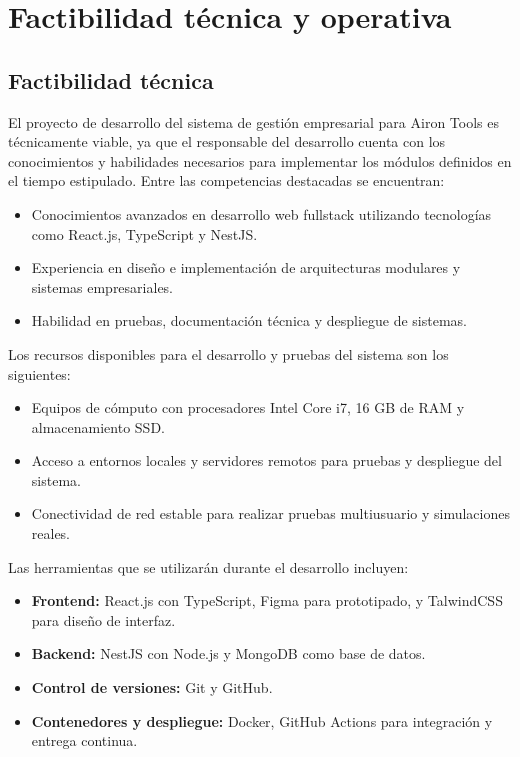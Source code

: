 



\section{Factibilidad técnica y operativa}

\subsection{Factibilidad técnica}

El proyecto de desarrollo del sistema de gestión empresarial para Airon Tools es técnicamente viable, ya que el responsable del desarrollo cuenta con los conocimientos y habilidades necesarios para implementar los módulos definidos en el tiempo estipulado. Entre las competencias destacadas se encuentran:

\begin{itemize}
	\item Conocimientos avanzados en desarrollo web fullstack utilizando tecnologías como React.js, TypeScript y NestJS.
	\item Experiencia en diseño e implementación de arquitecturas modulares y sistemas empresariales.
	\item Habilidad en pruebas, documentación técnica y despliegue de sistemas.
\end{itemize}

Los recursos disponibles para el desarrollo y pruebas del sistema son los siguientes:

\begin{itemize}
	\item Equipos de cómputo con procesadores Intel Core i7, 16 GB de RAM y almacenamiento SSD.
	\item Acceso a entornos locales y servidores remotos para pruebas y despliegue del sistema.
	\item Conectividad de red estable para realizar pruebas multiusuario y simulaciones reales.
\end{itemize}

Las herramientas que se utilizarán durante el desarrollo incluyen:

\begin{itemize}
	\item \textbf{Frontend:} React.js con TypeScript, Figma para prototipado, y TalwindCSS para diseño de interfaz.
	\item \textbf{Backend:} NestJS con Node.js y MongoDB como base de datos.
	\item \textbf{Control de versiones:} Git y GitHub.
	\item \textbf{Contenedores y despliegue:} Docker, GitHub Actions para integración y entrega continua.
\end{itemize}

